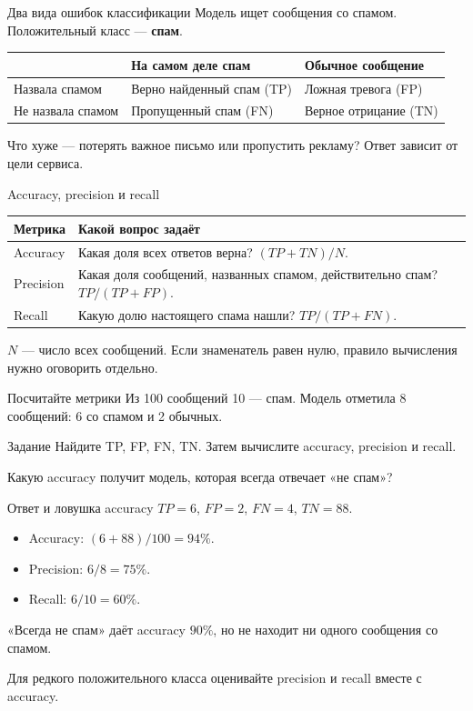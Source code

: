\begin{frame}{Два вида ошибок классификации}
  Модель ищет сообщения со спамом. Положительный класс --- \textbf{спам}.
  \medskip
  \par
  \begin{tabularx}{\linewidth}{@{}Y Y Y@{}}
    \toprule
    & На самом деле спам & Обычное сообщение\\
    \midrule
    Назвала спамом & Верно найденный спам (TP) & Ложная тревога (FP)\\
    Не назвала спамом & Пропущенный спам (FN) & Верное отрицание (TN)\\
    \bottomrule
  \end{tabularx}\par
  \medskip
  Что хуже --- потерять важное письмо или пропустить рекламу? Ответ зависит от цели сервиса.
\end{frame}

\begin{frame}{Accuracy, precision и recall}
  \par
  \begin{tabularx}{\linewidth}{@{}l Y@{}}
    \toprule
    \textbf{Метрика} & \textbf{Какой вопрос задаёт}\\
    \midrule
    Accuracy & Какая доля всех ответов верна? $(TP+TN)/N$.\\
    Precision & Какая доля сообщений, названных спамом, действительно спам? $TP/(TP+FP)$.\\
    Recall & Какую долю настоящего спама нашли? $TP/(TP+FN)$.\\
    \bottomrule
  \end{tabularx}\par
  \medskip
  $N$ --- число всех сообщений. Если знаменатель равен нулю, правило вычисления нужно оговорить отдельно.
\end{frame}

\begin{frame}{Посчитайте метрики}
  Из 100 сообщений 10 --- спам. Модель отметила 8 сообщений: 6 со спамом и 2 обычных.
  \begin{block}{Задание}
    Найдите TP, FP, FN, TN. Затем вычислите accuracy, precision и recall.
  \end{block}
  \medskip
  Какую accuracy получит модель, которая всегда отвечает «не спам»?
\end{frame}

\begin{frame}{Ответ и ловушка accuracy}
  $TP=6$, $FP=2$, $FN=4$, $TN=88$.
  \begin{itemize}
    \item Accuracy: $(6+88)/100=94\%$.
    \item Precision: $6/8=75\%$.
    \item Recall: $6/10=60\%$.
  \end{itemize}
  \medskip
  «Всегда не спам» даёт accuracy $90\%$, но не находит ни одного сообщения со спамом.
  \smallskip\par
  Для редкого положительного класса оценивайте precision и recall вместе с accuracy.
\end{frame}

